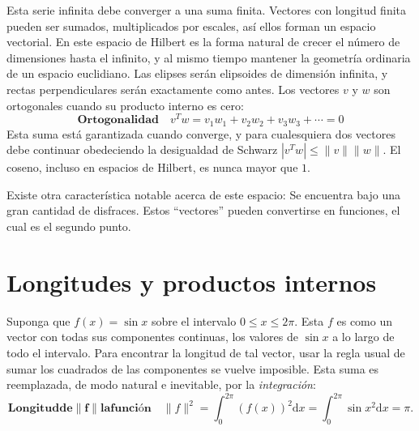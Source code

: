 \message{ !name(notes1.tex)}\documentclass[a4paper]{memoir}
\begin{document}

Esta serie infinita debe converger a una suma finita. Vectores con longitud finita pueden ser sumados, multiplicados por escales, así ellos forman un espacio vectorial. En este espacio de Hilbert es la forma natural de crecer el número de dimensiones hasta el infinito, y al mismo tiempo mantener la geometría ordinaria de un espacio euclidiano. Las elipses serán elipsoides de dimensión infinita, y rectas perpendiculares serán exactamente como antes. Los vectores $v$ y $w$ son ortogonales cuando su producto interno es cero:
\begin{equation}
  \mathbf{Ortogonalidad}\quad v^Tw=v_1w_1+v_2w_2+v_3w_3+\cdots =0
\end{equation}
Esta suma está garantizada cuando converge, y para cualesquiera dos vectores debe continuar obedeciendo la desigualdad de Schwarz $|v^Tw|\le \|v\|\|w\|$. El coseno, incluso en espacios de Hilbert, es nunca mayor que $1$.

Existe otra característica notable acerca de este espacio: Se encuentra bajo una gran cantidad de disfraces. Estos ``vectores'' pueden convertirse en funciones, el cual es el segundo punto.

\section{Longitudes y productos internos}

Suponga que $f(x)=\sin x$ sobre el intervalo $0\le x\le 2\pi$. Esta $f$ es como un vector con todas sus componentes continuas, los valores de $\sin x$ a lo largo de todo el intervalo. Para encontrar la longitud de tal vector, usar la regla usual de sumar los cuadrados de las componentes se vuelve imposible. Esta suma es reemplazada, de modo natural e inevitable, por la \emph{integración}:
\begin{equation}
  \mathbf{Longitud de }\|\bm{f}\|\mathbf{ la función}\quad\|f\|^2=\int_0^{2\pi}{(f(x))}^2\mathrm{d}x=\int_0^{2\pi}{\sin x}^2\mathrm{d}x=\pi.
\end{equation}
\end{document}
